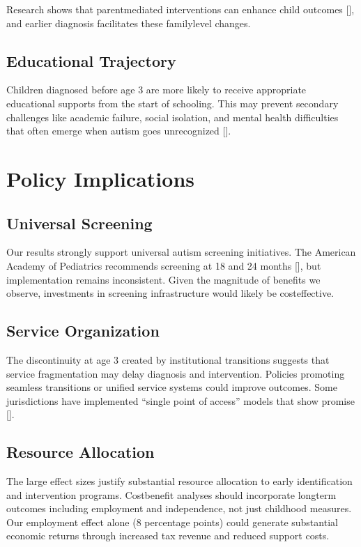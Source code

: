 \documentclass[letterpaper,10pt,english]{jupyterBook}
\begin{document}
\sphinxAtStartPar
Research shows that parent\sphinxhyphen{}mediated interventions can enhance child outcomes {[}{]}, and earlier diagnosis facilitates these family\sphinxhyphen{}level changes.


\subsection{Educational Trajectory}
\label{\detokenize{discussion:educational-trajectory}}
\sphinxAtStartPar
Children diagnosed before age 3 are more likely to receive appropriate educational supports from the start of schooling. This may prevent secondary challenges like academic failure, social isolation, and mental health difficulties that often emerge when autism goes unrecognized {[}{]}.


\section{Policy Implications}
\label{\detokenize{discussion:policy-implications}}

\subsection{Universal Screening}
\label{\detokenize{discussion:universal-screening}}
\sphinxAtStartPar
Our results strongly support universal autism screening initiatives. The American Academy of Pediatrics recommends screening at 18 and 24 months {[}{]}, but implementation remains inconsistent. Given the magnitude of benefits we observe, investments in screening infrastructure would likely be cost\sphinxhyphen{}effective.


\subsection{Service Organization}
\label{\detokenize{discussion:service-organization}}
\sphinxAtStartPar
The discontinuity at age 3 created by institutional transitions suggests that service fragmentation may delay diagnosis and intervention. Policies promoting seamless transitions or unified service systems could improve outcomes. Some jurisdictions have implemented “single point of access” models that show promise {[}{]}.


\subsection{Resource Allocation}
\label{\detokenize{discussion:resource-allocation}}
\sphinxAtStartPar
The large effect sizes justify substantial resource allocation to early identification and intervention programs. Cost\sphinxhyphen{}benefit analyses should incorporate long\sphinxhyphen{}term outcomes including employment and independence, not just childhood measures. Our employment effect alone (8 percentage points) could generate substantial economic returns through increased tax revenue and reduced support costs.
\end{document}
